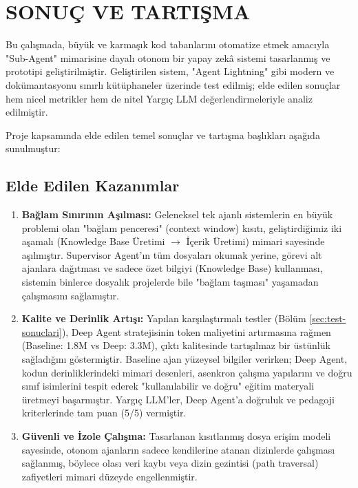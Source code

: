 \chapter{SONUÇ VE TARTIŞMA}
\label{ch:sonuc-ve-tartisma}

Bu çalışmada, büyük ve karmaşık kod tabanlarını otomatize etmek amacıyla "Sub-Agent" mimarisine dayalı otonom bir yapay zekâ sistemi tasarlanmış ve prototipi geliştirilmiştir. Geliştirilen sistem, "Agent Lightning" gibi modern ve dokümantasyonu sınırlı kütüphaneler üzerinde test edilmiş; elde edilen sonuçlar hem nicel metrikler hem de nitel Yargıç LLM değerlendirmeleriyle analiz edilmiştir.

Proje kapsamında elde edilen temel sonuçlar ve tartışma başlıkları aşağıda sunulmuştur:

\section{Elde Edilen Kazanımlar}

\begin{enumerate}
    \item \textbf{Bağlam Sınırının Aşılması:} Geleneksel tek ajanlı sistemlerin en büyük problemi olan "bağlam penceresi" (context window) kısıtı, geliştirdiğimiz iki aşamalı (Knowledge Base Üretimi $\rightarrow$ İçerik Üretimi) mimari sayesinde aşılmıştır. Supervisor Agent'ın tüm dosyaları okumak yerine, görevi alt ajanlara dağıtması ve sadece özet bilgiyi (Knowledge Base) kullanması, sistemin binlerce dosyalık projelerde bile "bağlam taşması" yaşamadan çalışmasını sağlamıştır.

    \item \textbf{Kalite ve Derinlik Artışı:} Yapılan karşılaştırmalı testler (Bölüm \ref{sec:test-sonuclari}), Deep Agent stratejisinin token maliyetini artırmasına rağmen (Baseline: 1.8M vs Deep: 3.3M), çıktı kalitesinde tartışılmaz bir üstünlük sağladığını göstermiştir. Baseline ajan yüzeysel bilgiler verirken; Deep Agent, kodun derinliklerindeki mimari desenleri, asenkron çalışma yapılarını ve doğru sınıf isimlerini tespit ederek "kullanılabilir ve doğru" eğitim materyali üretmeyi başarmıştır. Yargıç LLM'ler, Deep Agent'a doğruluk ve pedagoji kriterlerinde tam puan (5/5) vermiştir.

    \item \textbf{Güvenli ve İzole Çalışma:} Tasarlanan kısıtlanmış dosya erişim modeli sayesinde, otonom ajanların sadece kendilerine atanan dizinlerde çalışması sağlanmış, böylece olası veri kaybı veya dizin gezintisi (path traversal) zafiyetleri mimari düzeyde engellenmiştir.
\end{enumerate}

